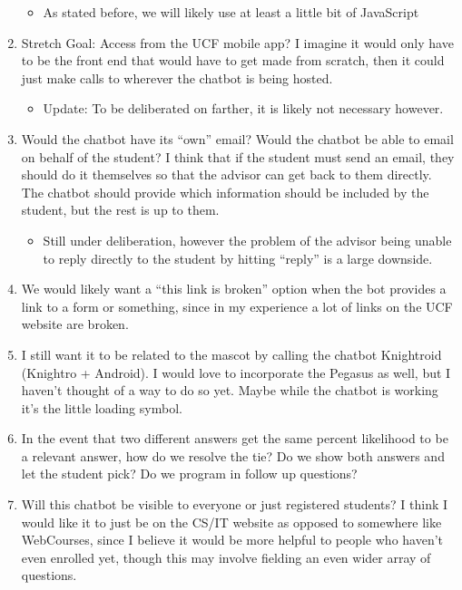 \documentclass[titlepage, 12pt]{article}
\begin{document}
\begin{enumerate}
    \begin{itemize}
        \item As stated before, we will likely use at least a little bit of JavaScript
    \end{itemize}
    \item Stretch Goal: Access from the UCF mobile app? I imagine it would only have to be the front end that would have to get made from scratch, then it could just make calls to wherever the chatbot is being hosted. 
    \begin{itemize}
        \item Update: To be deliberated on farther, it is likely not necessary however.
    \end{itemize}
    \item Would the chatbot have its “own” email? Would the chatbot be able to email on behalf of the student? I think that if the student must send an email, they should do it themselves so that the advisor can get back to them directly. The chatbot should provide which information should be included by the student, but the rest is up to them.
    \begin{itemize}
        \item Still under deliberation, however the problem of the advisor being unable to reply directly to the student by hitting “reply” is a large downside. 
    \end{itemize}
    \item We would likely want a “this link is broken” option when the bot provides a link to a form or something, since in my experience a lot of links on the UCF website are broken.
    \item I still want it to be related to the mascot by calling the chatbot Knightroid (Knightro + Android). I would love to incorporate the Pegasus as well, but I haven’t thought of a way to do so yet. Maybe while the chatbot is working it’s the little loading symbol.
    \item In the event that two different answers get the same percent likelihood to be a relevant answer, how do we resolve the tie? Do we show both answers and let the student pick? Do we program in follow up questions?
    \item Will this chatbot be visible to everyone or just registered students? I think I would like it to just be on the CS/IT website as opposed to somewhere like WebCourses, since I believe it would be more helpful to people who haven’t even enrolled yet, though this may involve fielding an even wider array of questions.

\end{enumerate}
\end{document}
